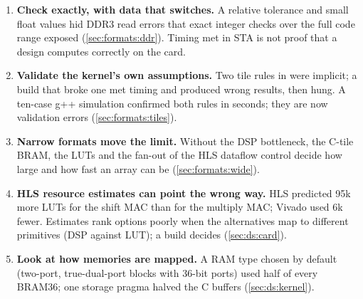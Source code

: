 \begin{enumerate}[leftmargin=1.4em]
        , and kernel utilisation columns read one position off.
  \item \textbf{Check exactly, with data that switches.} A relative tolerance and small float values hid DDR3 read
        errors that exact integer checks over the full code range exposed (\cref{sec:formats:ddr}). Timing met in
        STA is not proof that a design computes correctly on the card.
  \item \textbf{Validate the kernel's own assumptions.} Two tile rules in  were implicit; a build
        that broke one met timing and produced wrong results, then hung. A ten-case g++ simulation confirmed both
        rules in seconds; they are now validation errors (\cref{sec:formats:tiles}).
  \item \textbf{Narrow formats move the limit.} Without the DSP bottleneck, the C-tile BRAM, the LUTs and the fan-out
        of the HLS dataflow control decide how large and how fast an array can be (\cref{sec:formats:wide}).
  \item \textbf{HLS resource estimates can point the wrong way.} HLS predicted 95k more LUTs for the shift MAC than
        for the multiply MAC; Vivado used 6k fewer. Estimates rank options poorly when the alternatives map to
        different primitives (DSP against LUT); a build decides (\cref{sec:ds:card}).
  \item \textbf{Look at how memories are mapped.} A RAM type chosen by default (two-port, true-dual-port blocks with
        36-bit ports) used half of every BRAM36; one storage pragma halved the C buffers (\cref{sec:ds:kernel}).
\end{enumerate}


